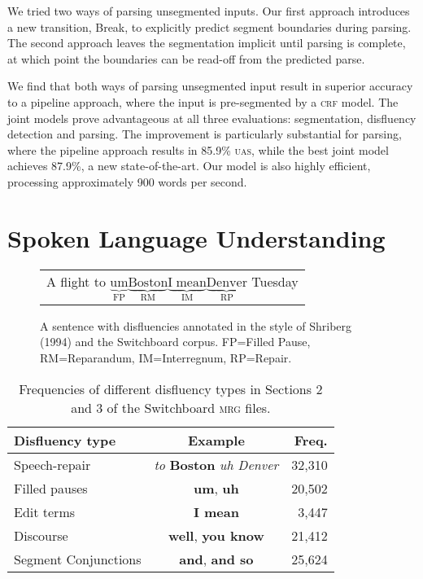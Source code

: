 \documentclass[11pt,letterpaper]{article}
\begin{document}
We tried two ways of parsing unsegmented inputs.  Our first approach introduces
a new transition, Break, to explicitly predict segment boundaries during parsing.
The second approach leaves the segmentation implicit until
parsing is complete, at which point the boundaries can be read-off from the
predicted parse.

We find that both ways of parsing unsegmented input result in superior accuracy
to a pipeline approach, where the input is pre-segmented by a \textsc{crf} model.
The joint models prove advantageous at all three evaluations: segmentation,
disfluency detection and parsing.
The improvement is particularly substantial for parsing, where the
pipeline approach results in 85.9\% \textsc{uas}, while the best joint model
achieves 87.9\%, a new state-of-the-art.  
Our model is also highly efficient, processing approximately 900 words per second.


\section{Spoken Language Understanding}

\begin{figure}
    \begin{tabular}{l}
        \small

        A flight to $\underbrace{\mathrm{um}}_\text{FP} \underbrace{\mathrm{Boston}}_\text{RM} \underbrace{\mathrm{I\;mean}}_\text{IM} \underbrace{\mathrm{Denver}}_\text{RP}$ Tuesday\\

\end{tabular}
\caption{\small A sentence with disfluencies annotated in the style of Shriberg (1994) 
    and the Switchboard corpus.
FP=Filled Pause, RM=Reparandum, IM=Interregnum, RP=Repair.
\label{fig:shriberg}}
\end{figure}

\begin{table}
    \centering
    \small
    \begin{tabular}{lc|r}
\hline
Disfluency type & Example & Freq. \\
\hline \hline
Speech-repair & \emph{to } \textbf{Boston} \emph{uh Denver} & 32,310 \\
Filled pauses    & \textbf{um}, \textbf{uh} & 20,502 \\
Edit terms & \textbf{I mean} & 3,447 \\ 
Discourse  & \textbf{well}, \textbf{you know} & 21,412  \\
Segment Conjunctions & \textbf{and}, \textbf{and so} & 25,624 \\
\hline
\end{tabular}
\caption{\small Frequencies of different disfluency types in Sections 2 and 3 of the
Switchboard \textsc{mrg} files.\label{tab:dfl_freqs}}
\vspace*{-4em}
\end{table}
\end{document}
